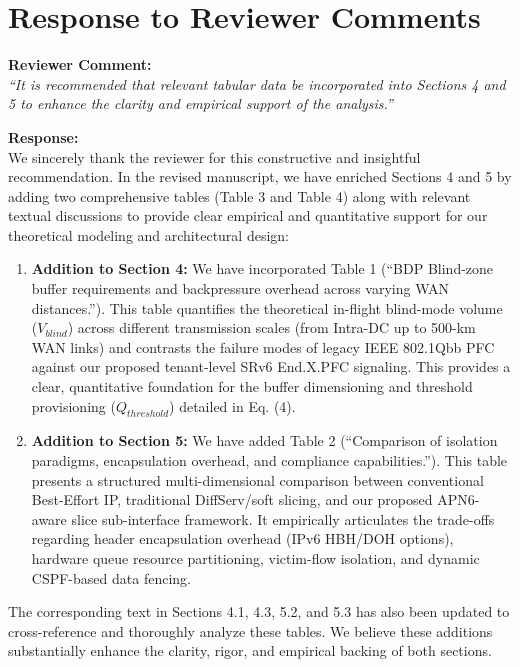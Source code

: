 \documentclass[11pt,a4paper]{article}
\begin{document}
\section*{Response to Reviewer Comments}

\noindent\textbf{Reviewer Comment:} \\
\textit{``It is recommended that relevant tabular data be incorporated into Sections 4 and 5 to enhance the clarity and empirical support of the analysis.''}

\vspace{0.5em}

\noindent\textbf{Response:} \\
We sincerely thank the reviewer for this constructive and insightful recommendation. In the revised manuscript, we have enriched Sections 4 and 5 by adding two comprehensive tables (Table 3 and Table 4) along with relevant textual discussions to provide clear empirical and quantitative support for our theoretical modeling and architectural design:

\begin{enumerate}[label=\textbf{\arabic*.}]
    \item \textbf{Addition to Section 4:}
    We have incorporated Table 1 (``BDP Blind-zone buffer requirements and backpressure overhead across varying WAN distances.''). This table quantifies the theoretical in-flight blind-mode volume ($V_{blind}$) across different transmission scales (from Intra-DC up to 500-km WAN links) and contrasts the failure modes of legacy IEEE 802.1Qbb PFC against our proposed tenant-level SRv6 End.X.PFC signaling. This provides a clear, quantitative foundation for the buffer dimensioning and threshold provisioning ($Q_{threshold}$) detailed in Eq. (4).

    \item \textbf{Addition to Section 5:}
    We have added Table 2 (``Comparison of isolation paradigms, encapsulation overhead, and compliance capabilities.''). This table presents a structured multi-dimensional comparison between conventional Best-Effort IP, traditional DiffServ/soft slicing, and our proposed APN6-aware slice sub-interface framework. It empirically articulates the trade-offs regarding header encapsulation overhead (IPv6 HBH/DOH options), hardware queue resource partitioning, victim-flow isolation, and dynamic CSPF-based data fencing.
\end{enumerate}

The corresponding text in Sections 4.1, 4.3, 5.2, and 5.3 has also been updated to cross-reference and thoroughly analyze these tables. We believe these additions substantially enhance the clarity, rigor, and empirical backing of both sections.
\end{document}
